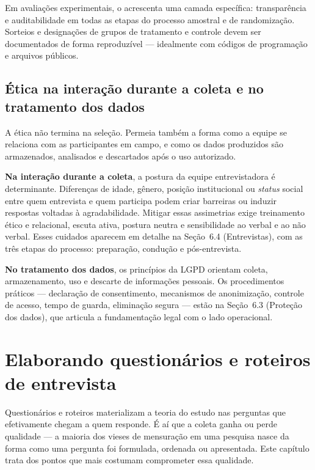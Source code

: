 \documentclass[12pt, a4paper, openany]{book}
\begin{document}
Em avalia\c{c}\~oes experimentais, o \citet{jpal2020practical} acrescenta uma camada espec\'ifica: transpar\^encia e auditabilidade em todas as etapas do processo amostral e de randomiza\c{c}\~ao. Sorteios e designa\c{c}\~oes de grupos de tratamento e controle devem ser documentados de forma reproduz\'ivel --- idealmente com c\'odigos de programa\c{c}\~ao e arquivos p\'ublicos.

\section{\'Etica na intera\c{c}\~ao durante a coleta e no tratamento dos dados}

A \'etica n\~ao termina na sele\c{c}\~ao. Permeia tamb\'em a forma como a equipe se relaciona com as participantes em campo, e como os dados produzidos s\~ao armazenados, analisados e descartados ap\'os o uso autorizado.

\textbf{Na intera\c{c}\~ao durante a coleta}, a postura da equipe entrevistadora \'e determinante. Diferen\c{c}as de idade, g\^enero, posi\c{c}\~ao institucional ou \textit{status} social entre quem entrevista e quem participa podem criar barreiras ou induzir respostas voltadas \`a agradabilidade. Mitigar essas assimetrias exige treinamento \'etico e relacional, escuta ativa, postura neutra e sensibilidade ao verbal e ao n\~ao verbal. Esses cuidados aparecem em detalhe na Se\c{c}\~ao~6.4 (Entrevistas), com as tr\^es etapas do processo: prepara\c{c}\~ao, condu\c{c}\~ao e p\'os-entrevista.

\textbf{No tratamento dos dados}, os princ\'ipios da LGPD orientam coleta, armazenamento, uso e descarte de informa\c{c}\~oes pessoais. Os procedimentos pr\'aticos --- declara\c{c}\~ao de consentimento, mecanismos de anonimiza\c{c}\~ao, controle de acesso, tempo de guarda, elimina\c{c}\~ao segura --- est\~ao na Se\c{c}\~ao~6.3 (Prote\c{c}\~ao dos dados), que articula a fundamenta\c{c}\~ao legal com o lado operacional.

\chapter{Elaborando question\'arios e roteiros de entrevista}

Question\'arios e roteiros materializam a teoria do estudo nas perguntas que efetivamente chegam a quem responde. \'E a\'i que a coleta ganha ou perde qualidade --- a maioria dos vieses de mensura\c{c}\~ao em uma pesquisa nasce da forma como uma pergunta foi formulada, ordenada ou apresentada. Este cap\'itulo trata dos pontos que mais costumam comprometer essa qualidade.
\end{document}
